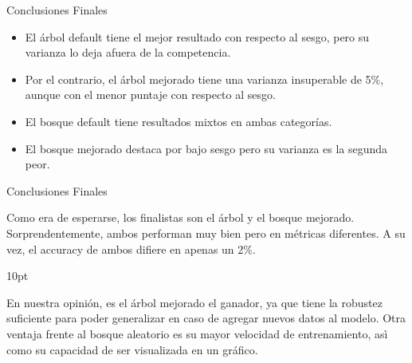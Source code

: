 \documentclass[pdf]{beamer}
\def\vspace{}%
\begin{document}
{\begin{frame}{Conclusiones Finales}


    \begin{itemize}
        \item El árbol default tiene el mejor resultado con respecto al sesgo, pero su varianza lo deja afuera de la competencia.
        \item Por el contrario, el árbol mejorado tiene una varianza insuperable de 5\%, aunque con el menor puntaje con respecto al sesgo.
        \item El bosque default tiene resultados mixtos en ambas categorías.
        \item El bosque mejorado destaca por bajo sesgo pero su varianza es la segunda peor.
    \end{itemize}
    
\end{frame}


\begin{frame}{Conclusiones Finales}

    Como era de esperarse, los finalistas son el árbol y el bosque mejorado. Sorprendentemente, ambos performan muy bien pero en métricas diferentes. A su vez, el accuracy de ambos difiere en apenas un 2\%.

\vspace{10pt} 

    En nuestra opinión, es el árbol mejorado el ganador, ya que tiene la robustez suficiente para poder generalizar en caso de agregar nuevos datos al modelo. Otra ventaja frente al bosque aleatorio es su mayor velocidad de entrenamiento, asì como su capacidad de ser visualizada en un gráfico.

\end{frame}
}
\end{document}
